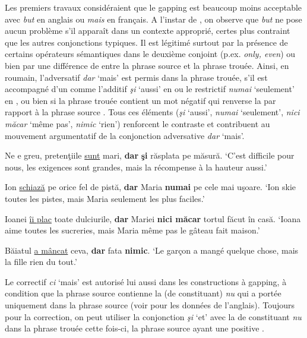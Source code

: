 Les premiers travaux considéraient que le gapping est beaucoup moins acceptable avec \textit{but} en anglais ou \textit{mais} en français. A l’instar de \citet{Repp2009}, on observe que \textit{but} ne pose aucun problème s’il apparaît dans un contexte approprié, certes plus contraint que les autres conjonctions typiques. Il est légitimé surtout par la présence de certains opérateurs sémantiques dans le deuxième conjoint (p.ex. \textit{only, even}) ou bien par une différence de  entre la phrase source et la phrase trouée. Ainsi, en roumain, l’adversatif \textit{dar} ‘mais’ est permis dans la phrase trouée, s’il est accompagné d’un  comme l’additif \textit{şi} ‘aussi’ en  ou le restrictif \textit{numai} ‘seulement’ en , ou bien si la phrase trouée contient un mot négatif qui renverse la  par rapport à la phrase source . Tous ces éléments (\textit{şi} ‘aussi’, \textit{numai} ‘seulement’, \textit{nici măcar} ‘même pas’, \textit{nimic} ‘rien’) renforcent le contraste et contribuent au mouvement argumentatif de la conjonction adversative \textit{dar} ‘mais’. 

\ea
\ea Ne e greu, pretenţiile \uline{sunt} mari, \textbf{dar} \textbf{şi} răsplata pe măsură. \label{ch2:ex52a}
\glt ‘C’est difficile pour nous, les exigences sont grandes, mais la récompense à la hauteur aussi.’  

\ex Ion \uline{schiază} pe orice fel de pistă, \textbf{dar} Maria \textbf{numai} pe cele mai uşoare. \label{ch2:ex52b}
\glt ‘Ion skie toutes les pistes, mais Maria seulement les plus faciles.’
\z
\z

\ea \label{ch2:ex53}
\ea Ioanei \uline{îi plac} toate dulciurile, \textbf{dar} Mariei \textbf{nici măcar} tortul făcut în casă.
\glt ‘Ioana aime toutes les sucreries, mais Maria même pas le gâteau fait maison.’  

\ex Băiatul \uline{a mâncat} ceva, \textbf{dar} fata \textbf{nimic}.
\glt ‘Le garçon a mangé quelque chose, mais la fille rien du tout.’ 
\z
\z

Le correctif \textit{ci} ‘mais’ est autorisé lui aussi dans les constructions à gapping, à condition que la phrase source contienne la  (de constituant) \textit{nu} qui a portée uniquement dans la phrase source  (voir \citealt{Toosarvandani2011} pour les données de l’anglais). Toujours pour la correction, on peut utiliser la conjonction \textit{şi} ‘et’ avec la  de constituant \textit{nu} dans la phrase trouée cette fois-ci, la phrase source ayant une  positive .

